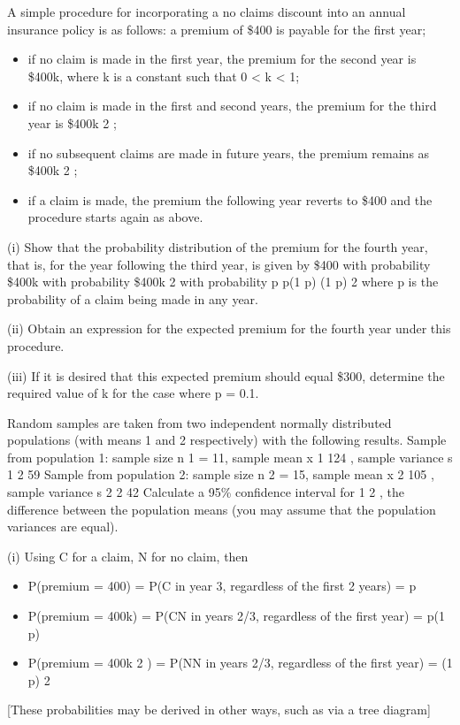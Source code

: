 \documentclass[a4paper,12pt]{article}
\begin{document}
\begin{enumerate}


A simple procedure for incorporating a no claims discount into an annual insurance policy is as follows:
a premium of \$400 is payable for the first year;
\begin{itemize}
\item if no claim is made in the first year, the premium for the second year is \$400k,
where k is a constant such that 0 < k < 1;
\item if no claim is made in the first and second years, the premium for the third
year is \$400k 2 ;
\item if no subsequent claims are made in future years, the premium remains as
\$400k 2 ;
\item if a claim is made, the premium the following year reverts to \$400 and the
procedure starts again as above.
\end{itemize}
(i)
Show that the probability distribution of the premium for the fourth year, that is, for the year following the third year, is given by
\$400
with probability
\$400k with probability
\$400k 2 with probability
p
p(1 p)
(1 p) 2
where p is the probability of a claim being made in any year.

(ii) Obtain an expression for the expected premium for the fourth year under this procedure.

(iii) If it is desired that this expected premium should equal \$300, determine the required value of k for the case where p = 0.1.

Random samples are taken from two independent normally distributed populations
(with means 1 and 2 respectively) with the following results.
Sample from population 1:
sample size n 1 = 11, sample mean x 1 124 , sample variance s 1 2
59
Sample from population 2:
sample size n 2 = 15, sample mean x 2 105 , sample variance s 2 2
42
Calculate a 95\%  confidence interval for 1
2 , the difference between the
population means (you may assume that the population variances are equal).


(i) Using C for a claim, N for no claim, then
\begin{itemize}
\item P(premium = 400) = P(C in year 3, regardless of the first 2 years) = p
\item P(premium = 400k) = P(CN in years 2/3, regardless of the first year) = p(1 p)
\item P(premium = 400k 2 ) = P(NN in years 2/3, regardless of the first year) = (1 p) 2
\end{itemize}
[These probabilities may be derived in other ways, such as via a tree diagram]


\end{enumerate}
\end{document}
